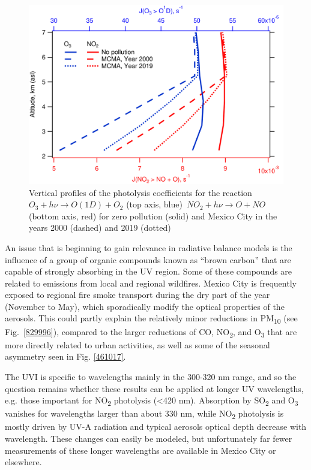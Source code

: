 \documentclass[journal=jacsat,manuscript=article]{achemso}
\begin{document}
\begin{figure}[H]
  \begin{center}
    \includegraphics[width=0.70\columnwidth]{figures/jvals}
    \caption{{Vertical profiles of the photolysis coefficients for the
          reaction~\(O_3 + h\nu \rightarrow O(1D) + O_2\) (top axis, blue)~\(NO_2 + h\nu \rightarrow O+NO \) (bottom
          axis, red) for zero pollution (solid) and Mexico City in the years 2000
          (dashed) and 2019 (dotted)
          {\label{973680}}%
        }}
  \end{center}
\end{figure}

An issue that is beginning to gain relevance in radiative balance models
is the influence of a group of organic compounds known as “brown carbon” that are
capable of strongly absorbing in the UV region.\citep{Laskin_2015} Some of
these compounds are related to emissions from local and regional
wildfires.\citep{Gadhavi_2010} Mexico City is frequently exposed to
regional fire smoke transport during the dry part of the year (November
to May)\citep{Rios_2019}, which sporadically modify the optical
properties of the aerosols.\citep{Barnard_2008} This could partly explain
the relatively minor reductions in PM\textsubscript{10} (see
Fig.~{\ref{829996}}), compared to the larger reductions
of CO, NO\textsubscript{2}, and O\textsubscript{3} that are more
directly related to urban activities, as well as some of the seasonal
asymmetry seen in Fig. {\ref{461017}}. ~

The UVI is specific to wavelengths mainly in the 300-320 nm range, and
so the question remains whether these results can be applied at longer
UV wavelengths, e.g. those important for NO\textsubscript{2} photolysis
(\textless{}420 nm). Absorption by SO\textsubscript{2} and
O\textsubscript{3} vanishes for wavelengths larger than about 330 nm,
while NO\textsubscript{2} photolysis is mostly driven by UV-A radiation
and typical aerosols optical depth decrease with wavelength. These changes can
easily be modeled, but unfortunately far fewer measurements of these
longer wavelengths are available in Mexico City or elsewhere.
\end{document}
